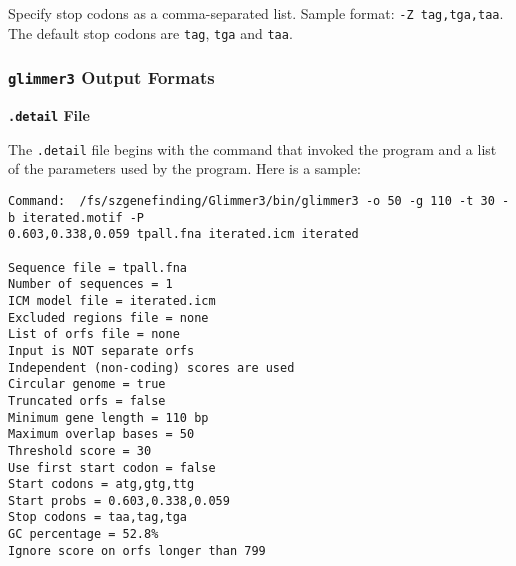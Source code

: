 \documentclass[fleqn,titlepage,11pt]{article}
\def\Pg#1{\texttt{#1}}
\begin{document}
  Specify stop codons as a comma-separated list.
  Sample format:  \verb`-Z tag,tga,taa`.
  The default stop codons are \Pg{tag}, \Pg{tga} and \Pg{taa}.
\el


\subsubsection{\Pg{glimmer3} Output Formats}

\smallskip
\noindent\textbf{\Pg{.detail} File}
\smallskip

The \Pg{.detail} file begins with the command that invoked the program and
a list of the parameters
used by the program.  Here is a sample:
\BSV
\begin{verbatim}
Command:  /fs/szgenefinding/Glimmer3/bin/glimmer3 -o 50 -g 110 -t 30 -b iterated.motif -P 
0.603,0.338,0.059 tpall.fna iterated.icm iterated

Sequence file = tpall.fna
Number of sequences = 1
ICM model file = iterated.icm
Excluded regions file = none
List of orfs file = none
Input is NOT separate orfs
Independent (non-coding) scores are used
Circular genome = true
Truncated orfs = false
Minimum gene length = 110 bp
Maximum overlap bases = 50
Threshold score = 30
Use first start codon = false
Start codons = atg,gtg,ttg
Start probs = 0.603,0.338,0.059
Stop codons = taa,tag,tga
GC percentage = 52.8%
Ignore score on orfs longer than 799
\end{verbatim}
\ESV
\end{document}
